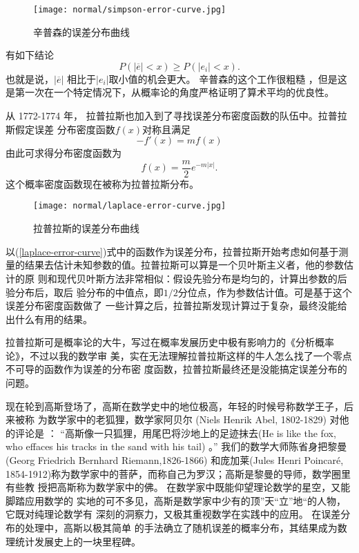 \begin{figure}[ht]
\centering
\texttt{[image: normal/simpson-error-curve.jpg]}
\caption{辛普森的误差分布曲线}
\end{figure}

有如下结论
$$P(|\overline{e}| < x) \ge P(|e_i|<x) . $$
也就是说，$|\overline{e}|$ 相比于$|e_i|$取小值的机会更大。 辛普森的这个工作很粗糙
，但是这是第一次在一个特定情况下，从概率论的角度严格证明了算术平均的优良性。

从 1772-1774 年， 拉普拉斯也加入到了寻找误差分布密度函数的队伍中。拉普拉斯假定误差
分布密度函数$f(x)$对称且满足
$$ -f'(x) = mf(x) $$
由此可求得分布密度函数为
\begin{equation}
\label{laplace-error-curve}
f(x) = \frac{m}{2} e^{-m|x|} .
\end{equation}
这个概率密度函数现在被称为拉普拉斯分布。

\begin{figure}[ht]
\centering
\texttt{[image: normal/laplace-error-curve.jpg]}
\caption{拉普拉斯的误差分布曲线}
\end{figure}


以(\ref{laplace-error-curve})式中的函数作为误差分布，拉普拉斯开始考虑如何基于测
量的结果去估计未知参数的值。拉普拉斯可以算是一个贝叶斯主义者，他的参数估计的原
则和现代贝叶斯方法非常相似：假设先验分布是均匀的，计算出参数的后验分布后，取后
验分布的中值点，即$1/2$分位点，作为参数估计值。可是基于这个误差分布密度函数做了
一些计算之后，拉普拉斯发现计算过于复杂，最终没能给出什么有用的结果。

拉普拉斯可是概率论的大牛，写过在概率发展历史中极有影响力的《分析概率论》，不过以我的数学审
美，实在无法理解拉普拉斯这样的牛人怎么找了一个零点不可导的函数作为误差的分布密
度函数，拉普拉斯最终还是没能搞定误差分布的问题。

现在轮到高斯登场了，高斯在数学史中的地位极高，年轻的时候号称数学王子，后来被称
为数学家中的老狐狸，数学家阿贝尔 (Niels Henrik Abel, 1802-1829) 对他的评论是 ：
“高斯像一只狐狸，用尾巴将沙地上的足迹抹去(He is like the fox, who effaces his
tracks in the sand with his tail) 。” 我们的数学大师陈省身把黎曼(Georg
Friedrich Bernhard Riemann,1826-1866) 和庞加莱(Jules Henri Poincar\'{e},
1854-1912)称为数学家中的菩萨，而称自己为罗汉；高斯是黎曼的导师，数学圈里有些教
授把高斯称为数学家中的佛。 在数学家中既能仰望理论数学的星空，又能脚踏应用数学的
实地的可不多见，高斯是数学家中少有的顶”天“立”地“的人物，它既对纯理论数学有
深刻的洞察力，又极其重视数学在实践中的应用。 在误差分布的处理中，高斯以极其简单
的手法确立了随机误差的概率分布，其结果成为数理统计发展史上的一块里程碑。

